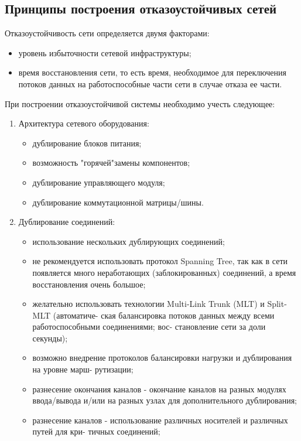 \documentclass[russian,utf8,emptystyle]{eskdtext}
\begin{document}
\subsection{Принципы построения отказоустойчивых сетей}
Отказоустойчивость сети определяется двумя факторами:
\begin{itemize}[label=-]
\item уровень избыточности сетевой инфраструктуры;
\item время восстановления сети, то есть время, необходимое для переключения потоков данных
на работоспособные части сети в случае отказа ее части.
\end{itemize}

При построении отказоустойчивой системы необходимо учесть следующее:
\begin{enumerate}[label=\arabic*.]
\item Архитектура сетевого оборудования:
\begin{itemize}[label=-]
\item дублирование блоков питания;
\item возможность "горячей"замены компонентов;
\item дублирование управляющего модуля;
\item дублирование коммутационной матрицы/шины.
\end{itemize}

\item Дублирование соединений:
\begin{itemize}[label=-]
\item использование нескольких дублирующих соединений;
\item не рекомендуется использовать протокол Spanning Tree, так как в сети появляется много
неработающих (заблокированных) соединений, а время восстановления очень большое;
\item желательно использовать технологии Multi-Link Trunk (MLT) и Split-MLT (автоматиче-
ская балансировка потоков данных между всеми работоспособными соединениями; вос-
становление сети за доли секунды);
\item возможно внедрение протоколов балансировки нагрузки и дублирования на уровне марш-
рутизации;
\item разнесение окончания каналов - окончание каналов на разных модулях ввода/вывода
и/или на разных узлах для дополнительного дублирования;
\item разнесение каналов - использование различных носителей и различных путей для кри-
тичных соединений;
\end{itemize}


\end{enumerate}
\end{document}
